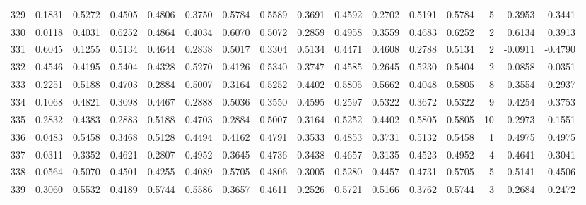 \begin{tabular}{lrrrrrrrrrrrrrrr}
329 &      0.1831 &  0.5272 &  0.4505 &  0.4806 &  0.3750 &  0.5784 &  0.5589 &  0.3691 &  0.4592 &  0.2702 &   0.5191 &     0.5784 &      5 &                    0.3953 &                     0.3441 \\
330 &      0.0118 &  0.4031 &  0.6252 &  0.4864 &  0.4034 &  0.6070 &  0.5072 &  0.2859 &  0.4958 &  0.3559 &   0.4683 &     0.6252 &      2 &                    0.6134 &                     0.3913 \\
331 &      0.6045 &  0.1255 &  0.5134 &  0.4644 &  0.2838 &  0.5017 &  0.3304 &  0.5134 &  0.4471 &  0.4608 &   0.2788 &     0.5134 &      2 &                   -0.0911 &                    -0.4790 \\
332 &      0.4546 &  0.4195 &  0.5404 &  0.4328 &  0.5270 &  0.4126 &  0.5340 &  0.3747 &  0.4585 &  0.2645 &   0.5230 &     0.5404 &      2 &                    0.0858 &                    -0.0351 \\
333 &      0.2251 &  0.5188 &  0.4703 &  0.2884 &  0.5007 &  0.3164 &  0.5252 &  0.4402 &  0.5805 &  0.5662 &   0.4048 &     0.5805 &      8 &                    0.3554 &                     0.2937 \\
334 &      0.1068 &  0.4821 &  0.3098 &  0.4467 &  0.2888 &  0.5036 &  0.3550 &  0.4595 &  0.2597 &  0.5322 &   0.3672 &     0.5322 &      9 &                    0.4254 &                     0.3753 \\
335 &      0.2832 &  0.4383 &  0.2883 &  0.5188 &  0.4703 &  0.2884 &  0.5007 &  0.3164 &  0.5252 &  0.4402 &   0.5805 &     0.5805 &     10 &                    0.2973 &                     0.1551 \\
336 &      0.0483 &  0.5458 &  0.3468 &  0.5128 &  0.4494 &  0.4162 &  0.4791 &  0.3533 &  0.4853 &  0.3731 &   0.5132 &     0.5458 &      1 &                    0.4975 &                     0.4975 \\
337 &      0.0311 &  0.3352 &  0.4621 &  0.2807 &  0.4952 &  0.3645 &  0.4736 &  0.3438 &  0.4657 &  0.3135 &   0.4523 &     0.4952 &      4 &                    0.4641 &                     0.3041 \\
338 &      0.0564 &  0.5070 &  0.4501 &  0.4255 &  0.4089 &  0.5705 &  0.4806 &  0.3005 &  0.5280 &  0.4457 &   0.4731 &     0.5705 &      5 &                    0.5141 &                     0.4506 \\
339 &      0.3060 &  0.5532 &  0.4189 &  0.5744 &  0.5586 &  0.3657 &  0.4611 &  0.2526 &  0.5721 &  0.5166 &   0.3762 &     0.5744 &      3 &                    0.2684 &                     0.2472 \\

\end{tabular}
